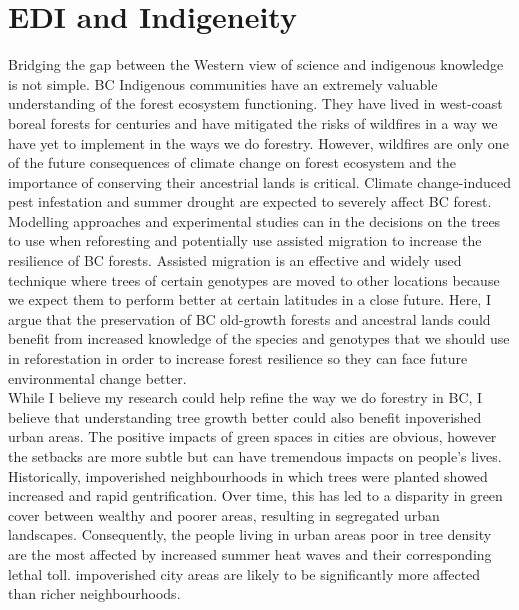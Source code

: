 \documentclass[11pt,letter]{article}
\begin{document}
\section *{EDI and Indigeneity}
Bridging the gap between the Western view of science and indigenous knowledge is not simple. BC Indigenous communities have an extremely valuable understanding of the forest ecosystem functioning. They have lived in west-coast boreal forests for centuries and have mitigated the risks of wildfires in a way we have yet to implement in the ways we do forestry. However, wildfires are only one of the future consequences of climate change on forest ecosystem and the importance of conserving their ancestrial lands is critical. Climate change-induced pest infestation and summer drought are expected to severely affect BC forest. Modelling approaches and experimental studies can in the decisions on the trees to use when reforesting and potentially use assisted migration to increase the resilience of BC forests. Assisted migration is an effective and widely used technique where trees of certain genotypes are moved to other locations because we expect them to perform better at certain latitudes in a close future. Here, I argue that the preservation of BC old-growth forests and ancestral lands could benefit from increased knowledge of the species and genotypes that we should use in reforestation in order to increase forest resilience so they can face future environmental change better.\\
While I believe my research could help refine the way we do forestry in BC, I believe that understanding tree growth better could also benefit inpoverished urban areas. The positive impacts of green spaces in cities are obvious, however the setbacks are more subtle but can have tremendous impacts on people's lives. Historically, impoverished neighbourhoods in which trees were planted showed increased and rapid gentrification. Over time, this has led to a disparity in green cover between wealthy and poorer areas, resulting in segregated urban landscapes. Consequently, the people living in urban areas poor in tree density are the most affected by increased summer heat waves and their corresponding lethal toll. impoverished city areas are likely to be significantly more affected than richer neighbourhoods. 
\end{document}
